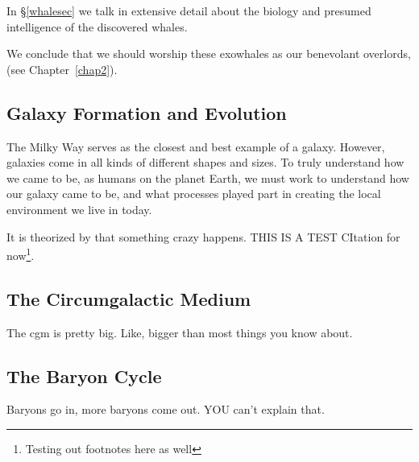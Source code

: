 In \S\ref{whalesec} we talk in extensive detail about the biology and presumed intelligence of the discovered whales.

We conclude that we should worship these exowhales as our benevolant overlords, (see Chapter~\ref{chap2}).

\subsection{Galaxy Formation and Evolution}
\label{ch1:galaxyevolution}

The Milky Way serves as the closest and best example of a galaxy. However, galaxies come in all kinds of different shapes and sizes. To truly understand how we came to be, as humans on the planet Earth, we must work to understand how our galaxy came to be, and what processes played part in creating the local environment we live in today.

It is theorized by \citet{Haardt2012} that something crazy happens. THIS IS A TEST CItation for now\footnote{Testing out footnotes here as well}.

\subsection{The Circumgalactic Medium}
\label{ch1:cgm}

The cgm is pretty big. Like, bigger than most things you know about.

\subsection{The Baryon Cycle}
\label{ch1:baryoncycle}

Baryons go in, more baryons come out. YOU can't explain that.
